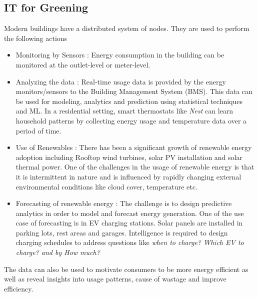 \documentclass[twoside]{article}
\begin{document}
\subsection{IT for Greening}
Modern buildings have a distributed system of nodes. They are used to perform the following actions 
\begin{itemize}
    \item Monitoring by Sensors : Energy consumption in the building can be monitored at the outlet-level or meter-level.
    \item Analyzing the data : Real-time usage data is provided by the energy monitors/sensors to the Building Management System (BMS). This data can be used for modeling, analytics and prediction using statistical techniques and ML. In a residential setting, smart thermostats like \textit{Nest} can learn household patterns by collecting energy usage and temperature data over a period of time.
    \item Use of Renewables : There has been a significant growth of renewable energy adoption including Rooftop wind turbines, solar PV installation and solar thermal power. One of the challenges in the usage of renewable energy is that it is intermittent in nature and is influenced by rapidly changing external environmental conditions like cloud cover, temperature etc. 
    \item Forecasting of renewable energy : The challenge is to design predictive analytics in order to model and forecast energy generation. One of the use case of forecasting is in EV charging stations. Solar panels are installed in parking lots, rest areas and garages. Intelligence is required to design charging schedules to address questions like \textit{when to charge? Which EV to charge? and by How much?}
\end{itemize}
The data can also be used to motivate consumers to be more energy efficient as well as reveal insights into usage patterns, cause of wastage and improve efficiency.
\end{document}
